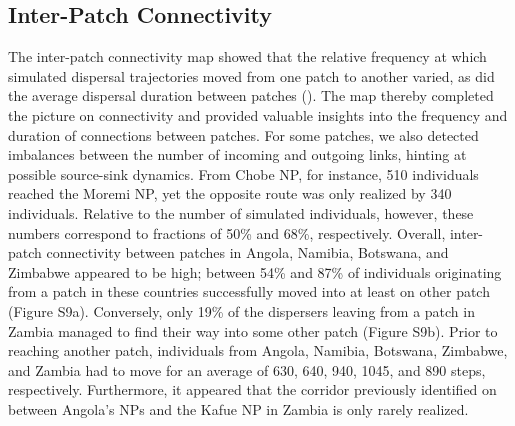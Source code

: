 \documentclass[abstract=on,10pt,a4paper,bibliography=totocnumbered]{article}
\begin{document}
\subsection{Inter-Patch Connectivity}
The inter-patch connectivity map showed that the relative frequency at which
simulated dispersal trajectories moved from one patch to another varied, as did
the average dispersal duration between patches ().
The map thereby completed the picture on connectivity and provided valuable
insights into the frequency and duration of connections between patches. For
some patches, we also detected imbalances between the number of incoming and
outgoing links, hinting at possible source-sink dynamics. From Chobe NP, for
instance, 510 individuals reached the Moremi NP, yet the opposite route was only
realized by 340 individuals. Relative to the number of simulated individuals,
however, these numbers correspond to fractions of 50\% and 68\%, respectively.
Overall, inter-patch connectivity between patches in Angola, Namibia, Botswana,
and Zimbabwe appeared to be high; between 54\% and 87\% of individuals
originating from a patch in these countries successfully moved into at least on
other patch (Figure S9a). Conversely, only 19\% of the dispersers leaving from a
patch in Zambia managed to find their way into some other patch (Figure S9b).
Prior to reaching another patch, individuals from Angola, Namibia, Botswana,
Zimbabwe, and Zambia had to move for an average of 630, 640, 940, 1045, and 890
steps, respectively. Furthermore, it appeared that the corridor previously
identified on  between Angola's NPs and the Kafue
NP in Zambia is only rarely realized.
\end{document}
